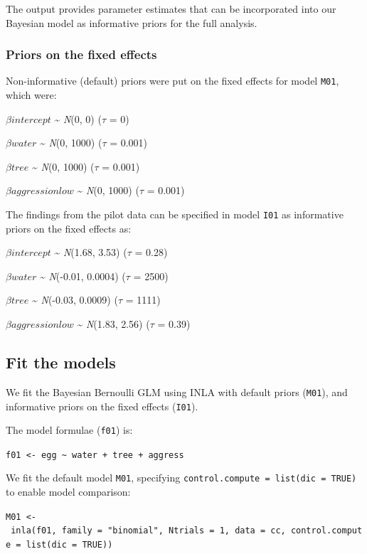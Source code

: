 \documentclass[
]{book}
\begin{document}
The output provides parameter estimates that can be incorporated into our Bayesian model as informative priors for the full analysis.

\hypertarget{bern-priors-fixed}{%
\subsubsection{Priors on the fixed effects}\label{bern-priors-fixed}}

Non-informative (default) priors were put on the fixed effects for model \texttt{M01}, which were:

\(\beta intercept\) \textasciitilde{} \emph{N}(0, 0) (\(\tau\) = 0)

\(\beta water\) \textasciitilde{} \emph{N}(0, 1000) (\(\tau\) = 0.001)

\(\beta tree\) \textasciitilde{} \emph{N}(0, 1000) (\(\tau\) = 0.001)

\(\beta aggressionlow\) \textasciitilde{} \emph{N}(0, 1000) (\(\tau\) = 0.001)

The findings from the pilot data can be specified in model \texttt{I01} as informative priors on the fixed effects as:

\(\beta intercept\) \textasciitilde{} \emph{N}(1.68, 3.53) (\(\tau\) = 0.28)

\(\beta water\) \textasciitilde{} \emph{N}(-0.01, 0.0004) (\(\tau\) = 2500)

\(\beta tree\) \textasciitilde{} \emph{N}(-0.03, 0.0009) (\(\tau\) = 1111)

\(\beta aggressionlow\) \textasciitilde{} \emph{N}(1.83, 2.56) (\(\tau\) = 0.39)

\hypertarget{bern-fit-models}{%
\subsection{Fit the models}\label{bern-fit-models}}

We fit the Bayesian Bernoulli GLM using INLA with default priors (\texttt{M01}), and informative priors on the fixed effects (\texttt{I01}).

The model formulae (\texttt{f01}) is:

\texttt{f01\ \textless{}-\ egg\ \textasciitilde{}\ water\ +\ tree\ +\ aggress}

We fit the default model \texttt{M01}, specifying \texttt{control.compute\ =\ list(dic\ =\ TRUE)} to enable model comparison:

\texttt{M01\ \textless{}-\ inla(f01,\ family\ =\ "binomial",\ Ntrials\ =\ 1,\ data\ =\ cc,\ control.compute\ =\ list(dic\ =\ TRUE))}
\end{document}
